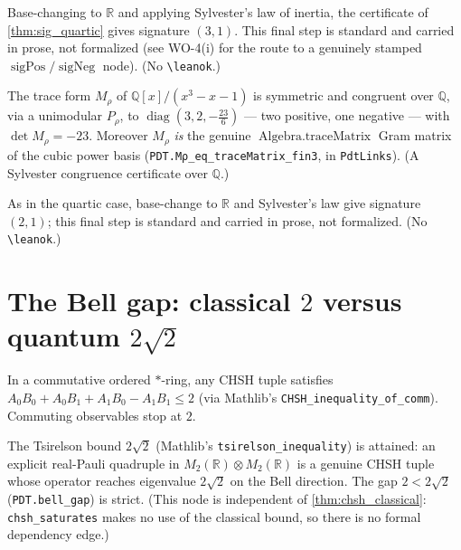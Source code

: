 \begin{corollary}
  Base-changing to $\mathbb{R}$ and applying Sylvester's law of inertia, the certificate of
  \cref{thm:sig_quartic} gives signature $(3,1)$. This final step is standard and carried in
  prose, not formalized (see WO-4(i) for the route to a genuinely stamped
  $\operatorname{sigPos}/\operatorname{sigNeg}$ node). (No \texttt{\textbackslash leanok}.)
\end{corollary}

\begin{theorem}
  \label{thm:sig_cubic}
  \leanok
  The trace form $M_\rho$ of $\mathbb{Q}[x]/(x^3-x-1)$ is symmetric and congruent over
  $\mathbb{Q}$, via a unimodular $P_\rho$, to $\operatorname{diag}(3,2,-\tfrac{23}{6})$ --- two
  positive, one negative --- with $\det M_\rho = -23$. Moreover $M_\rho$ \emph{is} the genuine
  $\operatorname{Algebra.traceMatrix}$ Gram matrix of the cubic power basis
  (\lstinline{PDT.Mρ_eq_traceMatrix_fin3}, in \lstinline{PdtLinks}). (A Sylvester congruence
  certificate over $\mathbb{Q}$.)
\end{theorem}

\begin{corollary}
  As in the quartic case, base-change to $\mathbb{R}$ and Sylvester's law give signature $(2,1)$;
  this final step is standard and carried in prose, not formalized. (No
  \texttt{\textbackslash leanok}.)
\end{corollary}

\chapter{The Bell gap: classical $2$ versus quantum $2\sqrt2$}

\begin{theorem}
  \label{thm:chsh_classical}
  \leanok
  In a commutative ordered $*$-ring, any CHSH tuple satisfies
  $A_0B_0 + A_0B_1 + A_1B_0 - A_1B_1 \le 2$ (via Mathlib's
  \lstinline{CHSH_inequality_of_comm}). Commuting observables stop at $2$.
\end{theorem}

\begin{theorem}
  \label{thm:tsirelson}
  \leanok
  The Tsirelson bound $2\sqrt2$ (Mathlib's \lstinline{tsirelson_inequality}) is attained:
  an explicit real-Pauli quadruple in $M_2(\mathbb{R})\otimes M_2(\mathbb{R})$ is a genuine
  CHSH tuple whose operator reaches eigenvalue $2\sqrt2$ on the Bell direction. The gap
  $2 < 2\sqrt2$ (\lstinline{PDT.bell_gap}) is strict. (This node is independent of
  \cref{thm:chsh_classical}: \lstinline{chsh_saturates} makes no use of the classical bound,
  so there is no formal dependency edge.)
\end{theorem}


